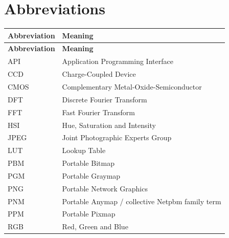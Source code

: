 \chapter*{Abbreviations}

\begin{longtable}{@{}ll@{}}
\toprule
\textbf{Abbreviation} & \textbf{Meaning} \\
\midrule
\endfirsthead
\toprule
\textbf{Abbreviation} & \textbf{Meaning} \\
\midrule
\endhead
API  & Application Programming Interface \\
CCD  & Charge-Coupled Device \\
CMOS & Complementary Metal-Oxide-Semiconductor \\
DFT  & Discrete Fourier Transform \\
FFT  & Fast Fourier Transform \\
HSI  & Hue, Saturation and Intensity \\
JPEG & Joint Photographic Experts Group \\
LUT  & Lookup Table \\
PBM  & Portable Bitmap \\
PGM  & Portable Graymap \\
PNG  & Portable Network Graphics \\
PNM  & Portable Anymap / collective Netpbm family term \\
PPM  & Portable Pixmap \\
RGB  & Red, Green and Blue \\
\bottomrule
\end{longtable}
